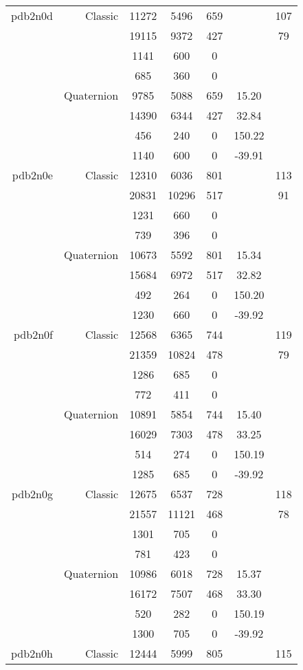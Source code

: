 \begin{xltabular}{\textwidth}{r|rcccSc}
pdb2n0d & Classic & 11272 & 5496 & 659 & & 107 \\
& & 19115 & 9372 & 427 & & 79 \\
& & 1141 & 600 & 0 & & \\
& & 685 & 360 & 0 & & \\
& Quaternion & 9785 & 5088 & 659 & 15.20 & \\
& & 14390 & 6344 & 427 & 32.84 & \\
& & 456 & 240 & 0 & 150.22 & \\
& & 1140 & 600 & 0 & -39.91 & \\ \addlinespace
pdb2n0e & Classic & 12310 & 6036 & 801 & & 113 \\
& & 20831 & 10296 & 517 & & 91 \\
& & 1231 & 660 & 0 & & \\
& & 739 & 396 & 0 & & \\
& Quaternion & 10673 & 5592 & 801 & 15.34 & \\
& & 15684 & 6972 & 517 & 32.82 & \\
& & 492 & 264 & 0 & 150.20 & \\
& & 1230 & 660 & 0 & -39.92 & \\ \addlinespace
pdb2n0f & Classic & 12568 & 6365 & 744 & & 119 \\
& & 21359 & 10824 & 478 & & 79 \\
& & 1286 & 685 & 0 & & \\
& & 772 & 411 & 0 & & \\
& Quaternion & 10891 & 5854 & 744 & 15.40 & \\
& & 16029 & 7303 & 478 & 33.25 & \\
& & 514 & 274 & 0 & 150.19 & \\
& & 1285 & 685 & 0 & -39.92 & \\ \addlinespace
pdb2n0g & Classic & 12675 & 6537 & 728 & & 118 \\
& & 21557 & 11121 & 468 & & 78 \\
& & 1301 & 705 & 0 & & \\
& & 781 & 423 & 0 & & \\
& Quaternion & 10986 & 6018 & 728 & 15.37 & \\
& & 16172 & 7507 & 468 & 33.30 & \\
& & 520 & 282 & 0 & 150.19 & \\
& & 1300 & 705 & 0 & -39.92 & \\ \addlinespace
pdb2n0h & Classic & 12444 & 5999 & 805 & & 115 \\

\end{xltabular}
